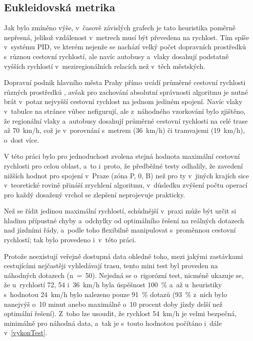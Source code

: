 \subsection{Eukleidovská metrika}
\label{eukleidMetr}
Jak bylo zmíněno výše, v~časově závislých grafech je tato heuristika poměrně nepřesná, jelikož vzdálenost v~metrech musí být převedena na rychlost. Tím spíše v~systému PID, ve kterém nejenže se nachází velký počet dopravních prostředků s~různou cestovní rychlostí, ale navíc autobusy a~vlaky dosahují podstatně vyšších rychlostí v~meziregionálních relacích než v~těch městských. 

Dopravní podnik hlavního města Prahy přímo uvádí průměrné cestovní rychlosti různých prostředků \cite{DPPvDatech}, avšak pro zachování absolutní správnosti algoritmu je nutné brát v~potaz nejvyšší cestovní rychlost na jednom jediném spojení. Navíc vlaky v~tabulce na stránce vůbec nefigurují, ale z~náhodného vzorkování bylo zjištěno, že regionální vlaky a~autobusy dosahují průměrné cestovní rychlosti na celé trase až 70~km/h, což je v~porovnání s~metrem (36~km/h) či tramvajemi (19~km/h), o~dost více.

V této práci bylo pro jednoduchost zvolena stejná hodnota maximální cestovní rychlosti pro celou oblast, a~to i~proto, že předběžné testy odhalily, že zavedení nižších hodnot pro spojení v~Praze (zóna P, 0, B) než pro ty v~jiných krajích sice v~teoretické rovině přináší zrychlení algoritmu, v~důsledku zvýšení počtu operací pro každý dosažený vrchol se zlepšení neprojevuje prakticky. 

Než se řídit jedinou maximální rychlostí, schůdnější v~praxi může být určit si hladinu přípustné chyby a~odchylky od optimálního řešení na reálných dotazech nad jízdními řády, a~podle toho flexibilně manipulovat s~proměnnou cestovní rychlostí; tak bylo provedeno i~v~této práci.

Protože neexistují veřejně dostupná data ohledně toho, mezi jakými zastávkami cestujícími nejčastěji vyhledávají trasu, tento mini test byl proveden na náhodných dotazech (n~=~50). Nejedná se o~rigorózní test, nicméně ukazuje se, že u~rychlostí 72, 54 i~36~km/h byla úspěšnost 100~\% a~až u~heuristiky s~hodnotou 24~km/h bylo nalezeno pouze 91~\% dotazů (93~\% z~nich bylo nanejvýš o~10 minut anebo maximálně o~10 procent doby jízdy delší než optimální řešení). Z~toho lze usoudit, že rychlost 54~km/h je velmi bezpečná, minimálně pro náhodná data, a~tak je s~touto hodnotou počítáno i~dále v~\autoref{vykonTest}.

